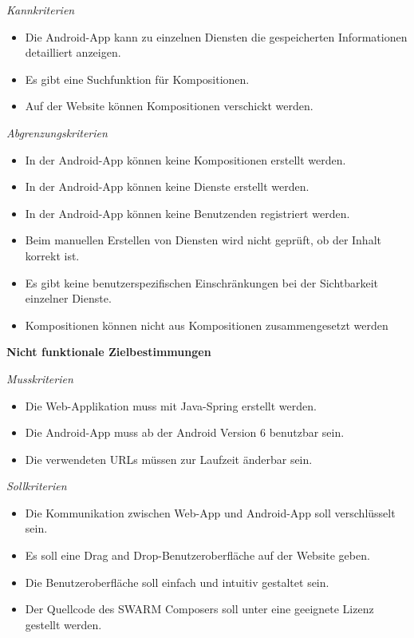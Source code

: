\textit{Kannkriterien}

\begin{itemize}[leftmargin=4pc]
	\item Die Android-App kann zu einzelnen Diensten die gespeicherten Informationen detailliert anzeigen.
	\item Es gibt eine Suchfunktion für Kompositionen.
	\item Auf der Website können Kompositionen verschickt werden.
\end{itemize}

\textit{Abgrenzungskriterien}

\begin{itemize}[leftmargin=4pc]
	\item In der Android-App können keine Kompositionen erstellt werden.
	\item In der Android-App können keine Dienste erstellt werden.
	\item In der Android-App können keine Benutzenden registriert werden.
	\item Beim manuellen Erstellen von Diensten wird nicht geprüft, ob der Inhalt korrekt ist.
	\item Es gibt keine benutzerspezifischen Einschränkungen bei der Sichtbarkeit einzelner Dienste.
	\item Kompositionen können nicht aus Kompositionen zusammengesetzt werden
\end{itemize}


\textbf{Nicht funktionale Zielbestimmungen}\newline

\textit{Musskriterien}

\begin{itemize}[leftmargin=4pc]
	\item Die Web-Applikation muss mit Java-Spring erstellt werden.
	\item Die Android-App muss ab der Android Version 6 benutzbar sein.
	\item Die verwendeten URLs müssen zur Laufzeit änderbar sein.
\end{itemize}

\textit{Sollkriterien}

\begin{itemize}[leftmargin=4pc]
	\item Die Kommunikation zwischen Web-App und Android-App soll verschlüsselt sein.
	\item Es soll eine Drag and Drop-Benutzeroberfläche auf der Website geben.
	\item Die Benutzeroberfläche soll einfach und intuitiv gestaltet sein.
	\item Der Quellcode des SWARM Composers soll unter eine geeignete Lizenz gestellt werden.
\end{itemize}


